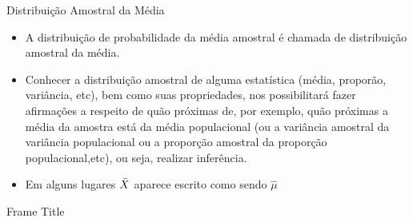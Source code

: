 \documentclass{beamer}
\begin{document}
\begin{frame}{Distribuição Amostral da Média}
\begin{itemize}
    \item  A distribuição de probabilidade da média amostral é chamada de
distribuição amostral da média.
    \item Conhecer a distribuição amostral de alguma estatística (média,
proporão, variância, etc), bem como suas propriedades, nos
possibilitará fazer afirmações a respeito de quão próximas de, por
exemplo, quão próximas a média da amostra está da média
populacional (ou a variância amostral da variância populacional ou a
proporção amostral da proporção populacional,etc), ou seja, realizar inferência.
\item Em alguns lugares $\Bar{X}$ aparece escrito como sendo $\hat{\mu}$
\end{itemize}

\end{frame}

\begin{frame}{Frame Title}
    
\end{frame}
\end{document}
